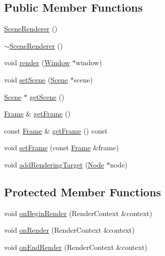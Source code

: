 \subsection*{Public Member Functions}
\begin{DoxyCompactItemize}
\item 
\mbox{\hyperlink{classec_1_1_scene_renderer_a7759ceff361e2d9b90ffe35ee61dc8c2}{Scene\+Renderer}} ()
\item 
\mbox{\hyperlink{classec_1_1_scene_renderer_ae8350e90e64b53e3dfb121c11a9d3283}{$\sim$\+Scene\+Renderer}} ()
\item 
void \mbox{\hyperlink{classec_1_1_scene_renderer_aa8cdd59972fd7dc7ce7c65e69c4a358b}{render}} (\mbox{\hyperlink{classec_1_1_window}{Window}} $\ast$window)
\item 
void \mbox{\hyperlink{classec_1_1_scene_renderer_a820900867a7c2b765eea61c6014aaee2}{set\+Scene}} (\mbox{\hyperlink{classec_1_1_scene}{Scene}} $\ast$scene)
\item 
\mbox{\hyperlink{classec_1_1_scene}{Scene}} $\ast$ \mbox{\hyperlink{classec_1_1_scene_renderer_abebdf008a71d9d51f550db87db92044d}{get\+Scene}} ()
\item 
\mbox{\hyperlink{classec_1_1_frame}{Frame}} \& \mbox{\hyperlink{classec_1_1_scene_renderer_a5e314c4d0e216f80e38d72792b0f81b1}{get\+Frame}} ()
\item 
const \mbox{\hyperlink{classec_1_1_frame}{Frame}} \& \mbox{\hyperlink{classec_1_1_scene_renderer_a8d40b598152f261d0fb3bcfa829e26e9}{get\+Frame}} () const
\item 
void \mbox{\hyperlink{classec_1_1_scene_renderer_a3981f0af87cf5b190b4dd5b0aa694472}{set\+Frame}} (const \mbox{\hyperlink{classec_1_1_frame}{Frame}} \&frame)
\item 
void \mbox{\hyperlink{classec_1_1_scene_renderer_a2d6d678c8e8cd9c068312a951cf8f33c}{add\+Rendering\+Target}} (\mbox{\hyperlink{classec_1_1_node}{Node}} $\ast$node)
\end{DoxyCompactItemize}
\subsection*{Protected Member Functions}
\begin{DoxyCompactItemize}
\item 
void \mbox{\hyperlink{classec_1_1_scene_renderer_ad1d418d6caa7ada328ae9648663c2d23}{on\+Begin\+Render}} (Render\+Context \&context)
\item 
void \mbox{\hyperlink{classec_1_1_scene_renderer_a3d57e498fde970f039783f7ee8b015fc}{on\+Render}} (Render\+Context \&context)
\item 
void \mbox{\hyperlink{classec_1_1_scene_renderer_ae4c7c5bfe81b36ab18e36c2ea75ea53b}{on\+End\+Render}} (Render\+Context \&context)
\end{DoxyCompactItemize}



